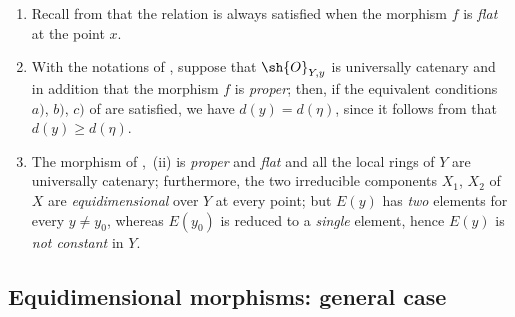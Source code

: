 \begin{remarks}[13.2.12]
\label{IV.13.2.12}
\begin{enumerate}[label=(\roman*)]
  \item Recall from  that the relation  is always satisfied when the morphism $f$ is \emph{flat} at the point $x$.
  \item With the notations of , suppose that $\sh{O}_{Y,y}$ is universally catenary and in addition that the morphism $f$ is \emph{proper}; then, if the equivalent conditions $a)$, $b)$, $c)$ of  are satisfied, we have $d(y)=d(\eta)$, since it follows from  that $d(y)\geq d(\eta)$.
  \item The morphism of ,~(ii) is \emph{proper} and \emph{flat} and all the local rings of $Y$ are universally catenary; furthermore, the two irreducible components $X_1$, $X_2$ of $X$ are \emph{equidimensional} over $Y$ at every point; but $E(y)$ has \emph{two} elements for every $y\neq y_0$, whereas $E(y_0)$ is reduced to a \emph{single} element, hence $E(y)$ is \emph{not constant} in $Y$.
\end{enumerate}
\end{remarks}

\subsection{Equidimensional morphisms: general case}
\label{subsection:IV.13.3}


